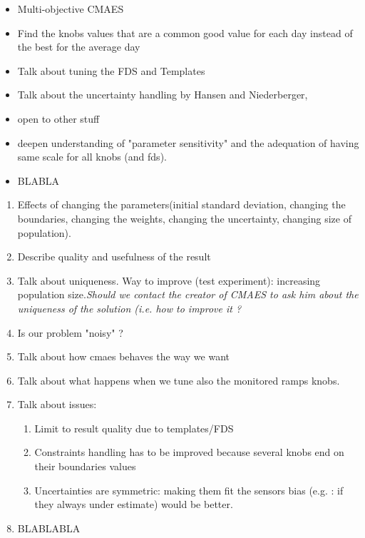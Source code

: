 \begin{itemize}
\item Multi-objective CMAES
\item Find the knobs values that are a common good value for each day instead of the best for the average day
\item Talk about tuning the FDS and Templates
\item Talk about the uncertainty handling by Hansen and Niederberger,
\item open to other stuff
\item deepen understanding of "parameter sensitivity" and the adequation of having same scale for all knobs (and fds).
\item BLABLA
\end{itemize}


\begin{enumerate}
	\item Effects of changing the parameters(initial standard deviation, changing the boundaries, changing the weights, changing the uncertainty, changing size of population).
	\item Describe quality and usefulness of the result
	\item Talk about uniqueness. Way to improve (test experiment): increasing population size.\emph{Should we contact the creator of CMAES to ask him about the uniqueness of the solution (i.e. how to improve it ?}
	\item Is our problem "noisy" ?
	\item Talk about how cmaes behaves the way we want
	\item Talk about what happens when we tune also the monitored ramps knobs.	
	\item Talk about issues:
\begin{enumerate}
	\item Limit to result quality due to templates/FDS
	\item Constraints handling has to be improved because several knobs end on their boundaries values\
	\item Uncertainties are symmetric: making them fit the sensors bias (e.g. : if they always under estimate) would be better.
\end{enumerate}
	\item BLABLABLA
\end{enumerate} 
